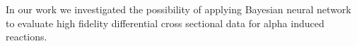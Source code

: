 
In our work we investigated the possibility of applying Bayesian neural network to evaluate high fidelity differential cross sectional data for alpha induced reactions.